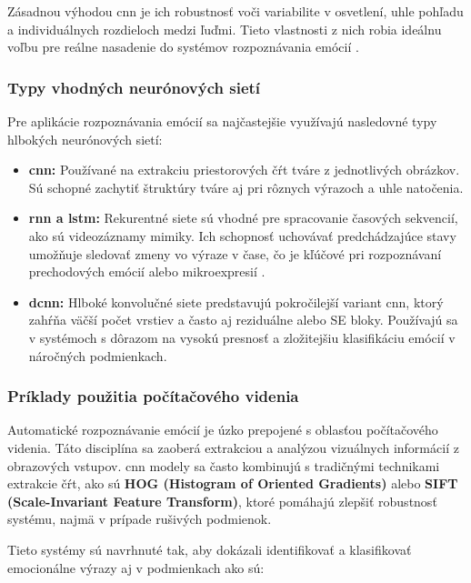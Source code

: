 Zásadnou výhodou \gls{cnn} je ich robustnosť voči variabilite v osvetlení, uhle pohľadu a individuálnych rozdieloch medzi ľuďmi. Tieto vlastnosti z nich robia ideálnu voľbu pre reálne nasadenie do systémov rozpoznávania emócií \cite{article05}.

\subsubsection{Typy vhodných neurónových sietí}

Pre aplikácie rozpoznávania emócií sa najčastejšie využívajú nasledovné typy hlbokých neurónových sietí:

\begin{itemize}
    \item \textbf{\gls{cnn}:} Používané na extrakciu priestorových čŕt tváre z jednotlivých obrázkov. Sú schopné zachytiť štruktúry tváre aj pri rôznych výrazoch a uhle natočenia.
    
    \item \textbf{\gls{rnn} a \gls{lstm}:} Rekurentné siete sú vhodné pre spracovanie časových sekvencií, ako sú videozáznamy mimiky. Ich schopnosť uchovávať predchádzajúce stavy umožňuje sledovať zmeny vo výraze v čase, čo je kľúčové pri rozpoznávaní prechodových emócií alebo mikroexpresií \cite{article02}.
    
    \item \textbf{\gls{dcnn}:} Hlboké konvolučné siete predstavujú pokročilejší variant \gls{cnn}, ktorý zahŕňa väčší počet vrstiev a často aj reziduálne alebo SE bloky. Používajú sa v systémoch s dôrazom na vysokú presnosť a zložitejšiu klasifikáciu emócií v náročných podmienkach.
\end{itemize}

\subsubsection{Príklady použitia počítačového videnia}

Automatické rozpoznávanie emócií je úzko prepojené s oblasťou počítačového videnia. Táto disciplína sa zaoberá extrakciou a analýzou vizuálnych informácií z obrazových vstupov. \gls{cnn} modely sa často kombinujú s tradičnými technikami extrakcie čŕt, ako sú \textbf{HOG (Histogram of Oriented Gradients)} alebo \textbf{SIFT (Scale-Invariant Feature Transform)}, ktoré pomáhajú zlepšiť robustnosť systému, najmä v prípade rušivých podmienok.

Tieto systémy sú navrhnuté tak, aby dokázali identifikovať a klasifikovať emocionálne výrazy aj v podmienkach ako sú:


